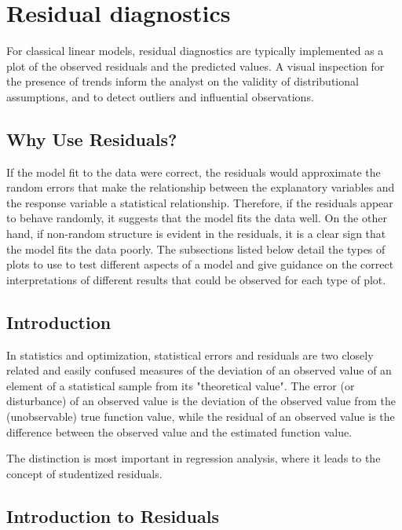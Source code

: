 \documentclass[12pt, a4paper]{report}
\theoremstyle{plain}
\theoremstyle{definition}
\theoremstyle{remark}
\begin{document}
\section{Residual diagnostics} %
For classical linear models, residual diagnostics are typically implemented as a plot of the observed residuals and the predicted values. A visual inspection for the presence of trends inform the analyst on the validity of distributional assumptions, and to detect outliers and influential observations.

\subsection{Why Use Residuals?}

If the model fit to the data were correct, the residuals would approximate the random errors that make the relationship between the explanatory variables and the response variable a statistical relationship. Therefore, if the residuals appear to behave randomly, it suggests that the model fits the data well. On the other hand, if non-random structure is evident in the residuals, it is a clear sign that the model fits the data poorly. The subsections listed below detail the types of plots to use to test different aspects of a model and give guidance on the correct interpretations of different results that could be observed for each type of plot.



\subsection{Introduction}
In statistics and optimization, statistical errors and residuals are two closely related and easily confused measures of the deviation of an observed value of an element of a statistical sample from its "theoretical value". The error (or disturbance) of an observed value is the deviation of the observed value from the (unobservable) true function value, while the residual of an observed value is the difference between the observed value and the estimated function value.

The distinction is most important in regression analysis, where it leads to the concept of studentized residuals.


\subsection{Introduction to Residuals}
\end{document}
